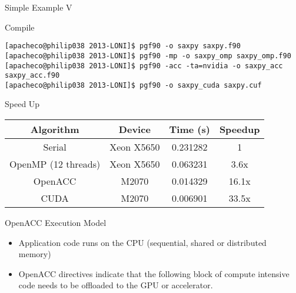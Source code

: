 \documentclass[c,mathserif,compress,xcolor=svgnames]{beamer}
\newenvironment{eblock}[0]
{
\begin{beamerboxesrounded}[upper=uppercol2,lower=lowercol2,shadow=true]}
{\end{beamerboxesrounded}}
\begin{document}
\begin{frame}[fragile]{\small Simple Example {\color{black}V}}
  \begin{eblock}{Compile}
    {\tiny
      \begin{Verbatim}
[apacheco@philip038 2013-LONI]$ pgf90 -o saxpy saxpy.f90
[apacheco@philip038 2013-LONI]$ pgf90 -mp -o saxpy_omp saxpy_omp.f90
[apacheco@philip038 2013-LONI]$ pgf90 -acc -ta=nvidia -o saxpy_acc saxpy_acc.f90
[apacheco@philip038 2013-LONI]$ pgf90 -o saxpy_cuda saxpy.cuf
      \end{Verbatim}
    }
  \end{eblock}
  \begin{eblock}{Speed Up}
    \begin{tabular}{|cccc|}
      \hline
      Algorithm & Device & Time (s) & Speedup \\
      \hline
      Serial & Xeon X5650 & 0.231282 & 1\\
      OpenMP (12 threads) & Xeon X5650 & 0.063231 & 3.6x\\
      OpenACC & M2070 & 0.014329 & 16.1x\\
      CUDA & M2070 & 0.006901 & 33.5x\\
      \hline
    \end{tabular}
  \end{eblock}
\end{frame}

\begin{frame}{\small OpenACC Execution Model}
  \begin{eblock}{}
    \begin{itemize}
      \item Application code runs on the CPU (sequential, shared or distributed memory)
      \item OpenACC directives indicate that the following block of compute intensive code needs to be offloaded to the GPU or accelerator.
    \end{itemize}
    \vspace{-0.5cm}
    
  \end{eblock}
\end{frame}
\end{document}
